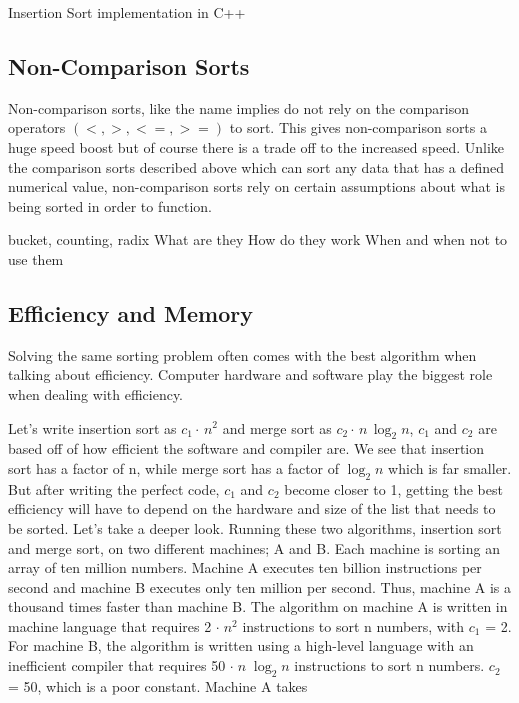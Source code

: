 \documentclass[12pt]{article}
\begin{document}
	
	
	\begin{Snippet}[h]
		
		\caption[Insertion Sort]{Insertion Sort implementation in C++}	
	\end{Snippet}
	
	
	
	\subsection{Non-Comparison Sorts}
	
	Non-comparison sorts, like the name implies do not rely on the comparison operators $(<,>,<=,>=)$ to sort.
	This gives non-comparison sorts a huge speed boost but of course there is a trade off to the increased speed. 
	Unlike the comparison sorts described above which can sort any data that has a defined numerical value, non-comparison sorts rely on certain assumptions about what is being sorted in order to function.
	
	bucket, counting, radix
	What are they
	How do they work
	When and when not to use them
	
	
	\subsection{Efficiency and Memory}
	
	Solving the same sorting problem often comes with the best algorithm when talking about efficiency.
	Computer hardware and software play the biggest role when dealing with efficiency.
	
	Let’s write insertion sort as $c_1 \cdot\,n^2$ and merge sort as $c_2 \cdot\,n\,\log_2{n}$, $c_1$ and $c_2$ are based off of how efficient the software and compiler are.
	We see that insertion sort has a factor of n, while merge sort has a factor of $\log_2{n}$ which is far smaller.
	But after writing the perfect code, $c_1$ and $c_2$ become closer to 1, getting the best efficiency will have to depend on the hardware and size of the list that needs to be sorted.
	Let’s take a deeper look. Running these two algorithms, insertion sort and merge sort, on two different machines; A and B. Each machine is sorting an array of ten million numbers.
	Machine A executes ten billion instructions per second and machine B executes only ten million per second.
	Thus, machine A is a thousand times faster than machine B.
	The algorithm on machine A is written in machine language that requires 2 $\cdot\;n^2$ instructions to sort n numbers, with $c_1$ = 2.
	For machine B, the algorithm is written using a high-level language with an inefficient compiler that requires 50 $\cdot\;n\;\log_2{n}$ instructions to sort n numbers. $c_2$ = 50, which is a poor constant.
	Machine A takes\newline
	
\end{document}
